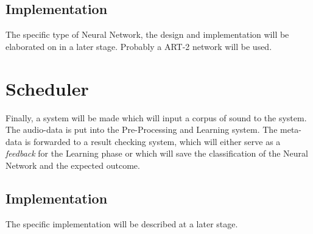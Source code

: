 \documentclass{article}
\begin{document}
\subsection{Implementation}
The specific type of Neural Network, the design and implementation will be elaborated on in a later stage. Probably a ART-2 network will be used.

\section{Scheduler}
Finally, a system will be made which will input a corpus of sound to the system. The audio-data is put into the Pre-Processing and Learning system. The meta-data is forwarded to a result checking system, which will either serve as a \emph{feedback} for the Learning phase or which will save the classification of the Neural Network and the expected outcome. 

\subsection{Implementation}
The specific implementation will be described at a later stage.	
\end{document}
